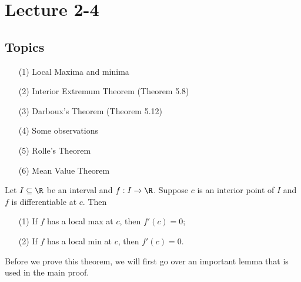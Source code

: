 \section{Lecture 2-4}

\subsection{Topics}

\begin{enumerate}
    \item[(1)] Local Maxima and minima
    \item[(2)] Interior Extremum Theorem (Theorem 5.8)
    \item[(3)] Darboux's Theorem (Theorem 5.12)
    \item[(4)] Some observations
    \item[(5)] Rolle's Theorem
    \item[(6)] Mean Value Theorem
\end{enumerate}

\begin{theorem}\label{Theorem 5.8}
    Let \( I \subseteq  \R   \) be an interval and \( f : I \to \R  \). Suppose \( c  \) is an interior point of \( I  \) and \( f  \) is differentiable at \( c  \). Then
    \begin{enumerate}
        \item[(1)] If \( f  \) has a local max at \( c  \), then \( f'(c)  = 0 \);
        \item[(2)] If \( f  \) has a local min at \( c  \), then \( f'(c) = 0  \).
    \end{enumerate}
\end{theorem}

Before we prove this theorem, we will first go over an important lemma that is used in the main proof. 

